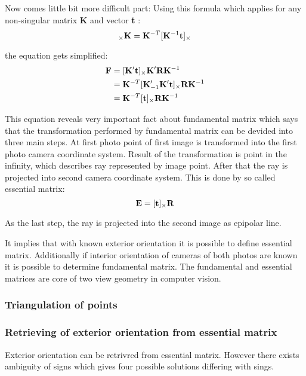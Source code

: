 \documentclass[a4paper,12pt]{report}
\newcommand{\ematr}[1]{
{\bf #1}
}
\newcommand{\evect}[1]{
{\bf #1}
}
\begin{document}
\begin{itemize}
Now comes little bit more difficult part:
Using this formula which applies for any non-singular matrix \ematr{K} and vector \evect{t}:
\begin{equation}
[\evect{t}]_{\times} \ematr{K} = \ematr{K}^{-T}[\ematr{K}^{-1}\evect{t}]_{\times}
\end{equation}

the equation gets simplified:
\begin{equation}
\begin{split}
\ematr{F}  &= [\ematr{K}' \evect{t}]_{\times} \ematr{K}' \ematr{R} \ematr{K}^{-1} \\
	   &= \ematr{K}^{-T} [\ematr{K}'_{-1} \ematr{K}' \evect{t}]_{\times} \ematr{R} \ematr{K}^{-1} \\
	   &= \ematr{K}^{-T} [\evect{t}]_{\times} \ematr{R} \ematr{K}^{-1}
\end{split}
\end{equation}

This equation reveals very important fact about fundamental matrix which says that the transformation performed 
by fundamental matrix can be devided into three main steps.
At first photo point of first image is transformed into the first photo camera coordinate system. Result of the transformation is 
point in the infinity, which describes ray represented by image point. 
After that the ray is projected into second camera coordinate system. This is done by so called essential matrix:
\begin{equation}
	 \ematr{E}  = [\evect{t}]_{\times} \ematr{R}
\end{equation}


As the last step, the ray is projected into the second image as epipolar line.


It implies that with known exterior orientation it is possible to define essential matrix. 
Additionally if interior orientation of cameras of both photos are known it is possible to determine fundamental matrix. 
The fundamental and essential matrices are core of two view geometry in computer vision.

\subsubsection{Triangulation of points}
\label{sec:triang}

\subsubsection{Retrieving of exterior orientation from essential matrix}
\label{sec:ess_eo}
Exterior orientation
can be retrivred from essential matrix. However there exists ambiguity of signs which gives 
four possible solutions differing with sings.


\end{itemize}
\end{document}
